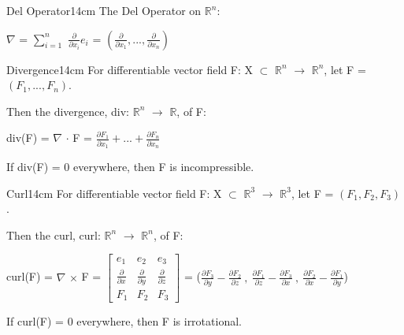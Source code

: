     \vspace{0.5cm}



    \begin{definition}{Del Operator}{14cm}
        The {\color{lblue} Del Operator} on $\mathbb{R}^n$:
        
        \hspace{0.5cm}
        $\nabla$ = $\sum_{i=1}^n$ $\frac{\partial}{\partial x_i}e_i$
        = $(\frac{\partial}{\partial x_1},...,\frac{\partial}{\partial x_n})$
    \end{definition}

    \vspace{0.5cm}



    \begin{definition}{Divergence}{14cm}
        For differentiable vector field F: X $\subset$ $\mathbb{R}^n$
        $\rightarrow$ $\mathbb{R}^n$, let F = $(F_1,...,F_n)$.

        Then the {\color{lblue} divergence}, div:
        $\mathbb{R}^n$ $\rightarrow$ $\mathbb{R}$, of F:

        \hspace{0.5cm}
        div(F)
        = $\nabla$ $\cdot$ F
        = $\frac{\partial F_1}{\partial x_1}
                + ... + \frac{\partial F_n}{\partial x_n}$

        If div(F) = 0 everywhere, then F is incompressible.
    \end{definition}

    \newpage



    \begin{definition}{Curl}{14cm}
        For differentiable vector field F: X $\subset$ $\mathbb{R}^3$
        $\rightarrow$ $\mathbb{R}^3$, let F = $(F_1,F_2,F_3)$.

        Then the {\color{lblue} curl}, curl:
        $\mathbb{R}^n$ $\rightarrow$ $\mathbb{R}^n$, of F: 

        \hspace{0.5cm}
        curl(F)
        = $\nabla$ $\times$ F =
        $
        \begin{bmatrix}
            e_1 & e_2 & e_3 \\
            \frac{\partial}{\partial x} & \frac{\partial}{\partial y}
                & \frac{\partial}{\partial z} \\
            F_1 & F_2 & F_3
        \end{bmatrix}
        $
        = ($\frac{\partial F_3}{\partial y}-\frac{\partial F_2}{\partial z} \ , \
            \frac{\partial F_1}{\partial z}-\frac{\partial F_3}{\partial x} \ , \
            \frac{\partial F_2}{\partial x}-\frac{\partial F_1}{\partial y}$)

        If curl(F) = 0 everywhere, then F is irrotational.
    \end{definition}

